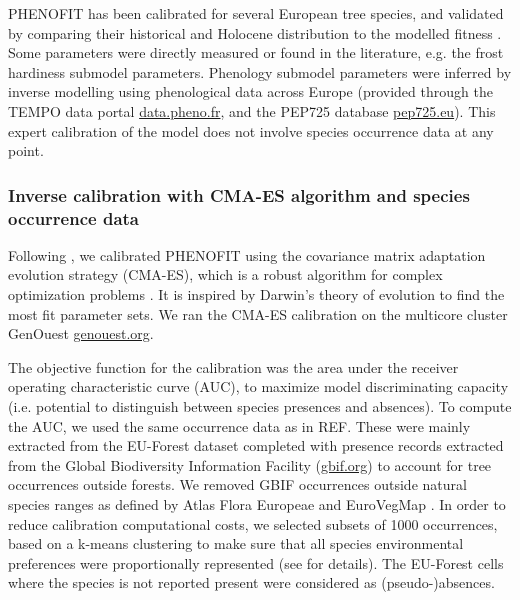 \documentclass[letterpaper,8pt]{extarticle}  %
\begin{document}
\begin{doublespacing}
\begin{linenumbers}
PHENOFIT has been calibrated for several European tree species, and validated  by comparing their historical and Holocene distribution to the modelled fitness  \citep{Saltre2013, Duputie2015, Gauzere2020, VanderMeersch2024}. Some parameters were directly measured or found in the literature, e.g. the frost hardiness submodel parameters. Phenology submodel parameters were inferred by inverse modelling using phenological data across Europe (provided through the TEMPO data portal \url{data.pheno.fr}, and the PEP725 database \url{pep725.eu}). %
This expert calibration of the model does not involve species occurrence data at any point.

\subsubsection{Inverse calibration with CMA-ES algorithm and species occurrence data}

Following \citet{VanderMeersch2023}, we calibrated PHENOFIT using the covariance matrix adaptation evolution strategy (CMA-ES), which  is a robust algorithm for complex optimization problems \citep{Hansen2001}. It is inspired by Darwin's theory of evolution to find the most fit parameter sets. We ran the CMA-ES calibration on the multicore cluster GenOuest \url{genouest.org}.

The objective function for the calibration was the area under the receiver operating characteristic curve (AUC), to maximize model discriminating capacity (i.e. potential to distinguish between species presences and absences). To compute the AUC, we used the same occurrence data as in REF. These were mainly extracted from the EU-Forest dataset \citep{Mauri2017} completed with presence records extracted from the Global Biodiversity Information Facility (\url{gbif.org}) to account for tree occurrences outside forests. We removed GBIF occurrences outside natural species ranges as defined by Atlas Flora Europeae \citep{AFE2005} and EuroVegMap \citep{EVM2003}. In order to reduce calibration computational costs, we selected subsets of 1000 occurrences,  based on a k-means clustering to make sure that all species environmental preferences were proportionally represented (see \citet{VanderMeersch2023} for details). The EU-Forest cells where the species is not reported present were considered as (pseudo-)absences.


\end{linenumbers}
\end{doublespacing}
\end{document}
